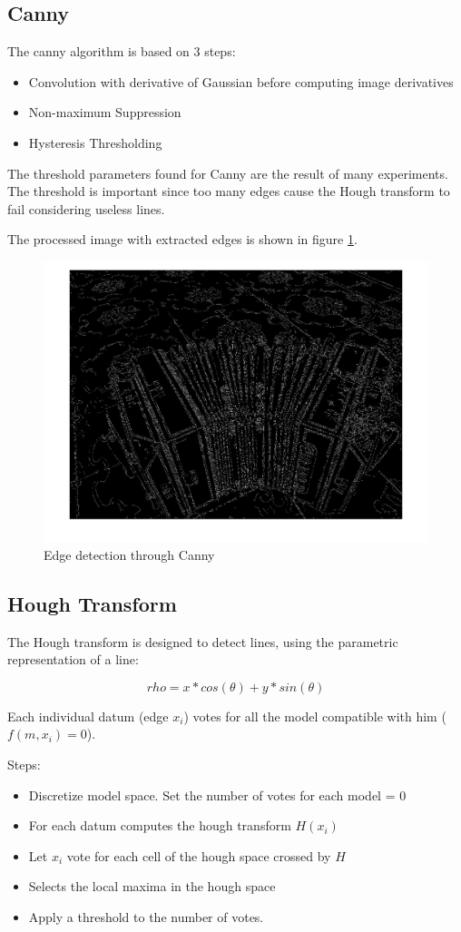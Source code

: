 \documentclass[11pt, oneside]{article}   	%
\begin{document}
\subsection{Canny} 
The canny algorithm is based on 3 steps:

\begin{itemize}
\item Convolution with derivative of Gaussian before computing image derivatives
\item Non-maximum Suppression
\item Hysteresis Thresholding
\end{itemize}

The threshold parameters found for Canny are the result of many experiments. The threshold is important since too many edges cause the Hough transform to fail considering useless lines.

The processed image with extracted edges is shown in figure \ref{edge}.

\begin{figure}

\includegraphics[width=0.6\linewidth]{edges.jpg}

\caption{Edge detection through Canny}
\label{edge}

\end{figure}

\subsection{Hough Transform} 
The Hough transform is designed to detect lines, using the parametric representation of a line:

$$rho = x*cos(\theta) + y*sin(\theta) $$

Each individual datum (edge $x_i$) votes for all the model compatible with him ( $f(m,x_i) = 0 $).

Steps:

\begin{itemize}
\item Discretize model space. Set the number of votes for each model = 0
\item For each datum computes the hough transform $H(x_i)$
\item Let $x_i$ vote for each cell of the hough space crossed by $H$
\item Selects the local maxima in the hough space
\item Apply a threshold to the number of votes.
\end{itemize}
\end{document}
